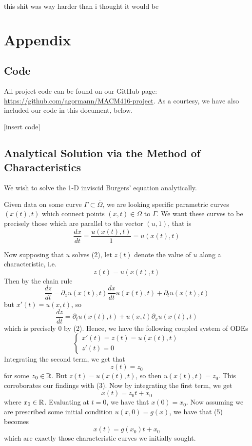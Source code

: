 \documentclass{myproject}
\begin{document}
this shit was way harder than i thought it would be

\newpage
\appendix
\section{Appendix}
\subsection{Code}

All project code can be found on our GitHub page: \url{https://github.com/agormann/MACM416-project}. As a courtesy, we have also included our code in this document, below.

[insert code]

\subsection{Analytical Solution via the Method of Characteristics}

We wish to solve the 1-D inviscid Burgers' equation analytically.

Given data on some curve $ \Gamma \subset \overline{\Omega} $, we are looking specific parametric curves $ (x(t), t) $ which connect points $(x, t) \in \Omega$ to $ \Gamma $. We want these curves to be precisely those which are parallel to the vector $(u, 1)$, that is
\[
    \frac{dx}{dt} = \frac{u(x(t), t)}{1} = u(x(t), t)
\]

Now supposing that $u$ solves (2), let $z(t)$ denote the value of $u$ along a characteristic, i.e. 
\[
    z(t) = u(x(t), t)
\]
Then by the chain rule
\[
    \frac{dz}{dt} = \partial_x u(x(t), t) \frac{dx}{dt}u(x(t), t) + \partial_t u(x(t), t)
\]
but $ x'(t) = u(x,t) $, so
\[
    \frac{dz}{dt} = \partial_t u(x(t), t) + u(x,t)\partial_x u(x(t), t)
\]
which is precisely 0 by (2). Hence, we have the following coupled system of ODEs
\begin{equation}
    \begin{cases}
        x'(t) = z(t) = u(x(t), t) \\
        z'(t) = 0
    \end{cases}
\end{equation}
Integrating the second term, we get that
\[
    z(t) = z_0
\]
for some $ z_0 \in \operatorname{\mathbb{R}} $. But $z(t) = u(x(t), t)$, so then $u(x(t), t) = z_0$. This corroborates our findings with (3). Now by integrating the first term, we get
\begin{equation}
    x(t) = z_0t + x_0
\end{equation}
where $ x_0 \in \operatorname{\mathbb{R}} $. Evaluating at $t=0$, we have that $x(0) = x_0$. Now assuming we are prescribed some initial condition $u(x,0) = g(x)$, we have that (5) becomes
\begin{equation}
    x(t) = g(x_0)t + x_0
\end{equation}
which are exactly those characteristic curves we initially sought.

\nocite{choksi2022}
\nocite{iserles2009}
\nocite{leveque1992}
\nocite{leveque2002}
\printbibliography
\end{document}
